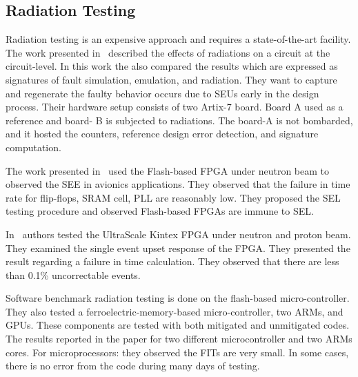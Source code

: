 \subsection{Radiation Testing}
Radiation testing is an expensive approach and requires a state-of-the-art facility. The work presented in~\cite{hobeika2014multi} described the effects of radiations on a circuit at the circuit-level. In this work the also compared the results which are expressed as signatures of fault simulation, emulation, and radiation. They want to capture and regenerate the faulty behavior occurs due to SEUs early in the design process. Their hardware setup consists of two Artix-7 board. Board A used as a reference and board- B is subjected to radiations. The board-A is not bombarded, and it hosted the counters, reference design error detection, and signature computation.

The work presented in~\citep{dsilva2015neutron} used the Flash-based FPGA under neutron beam to observed the SEE in avionics applications. They observed that the failure in time rate for flip-flops, SRAM cell, PLL are reasonably low. They proposed the SEL testing procedure and observed Flash-based FPGAs are immune to SEL. 

In~\citep{maillard2015neutron} authors tested the UltraScale Kintex FPGA under neutron and proton beam. They examined the single event upset response of the FPGA. They presented the result regarding a failure in time calculation. They observed that there are less than 0.1\% uncorrectable events. 


Software benchmark radiation testing is done on the flash-based micro-controller. They also tested a ferroelectric-memory-based micro-controller, two ARMs, and GPUs. These components are tested with both mitigated and unmitigated codes. The results reported in the paper for two different microcontroller and two ARMs cores. For microprocessors: they observed the FITs are very small. In some cases, there is no error from the code during many days of testing.










